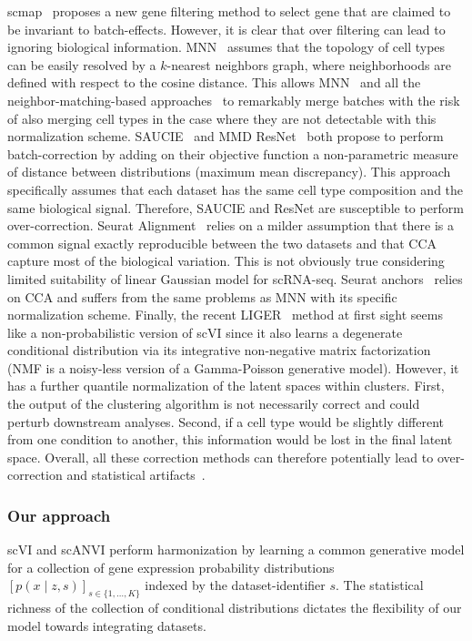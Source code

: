 scmap~\cite{scmap} proposes a new gene filtering method to select gene that are claimed to be invariant to batch-effects. However, it is clear that over filtering can lead to ignoring biological information.  
MNN~\cite{MNN} assumes that the topology of cell types can be easily resolved by a $k$-nearest neighbors graph, where neighborhoods are defined with respect to the cosine distance. This allows MNN~\cite{MNN} and all the neighbor-matching-based approaches~\cite{SEURAT3,scanorama} to remarkably merge batches with the risk of also merging cell types in the case where they are not detectable with this normalization scheme. 
SAUCIE~\cite{saucie} and MMD ResNet~\cite{resnetbatcheffect} both propose to perform batch-correction by adding on their objective function a non-parametric measure of distance between distributions (maximum mean discrepancy). This approach specifically assumes that each dataset has the same cell type composition and the same biological signal. Therefore, SAUCIE and ResNet are susceptible to perform over-correction. 
Seurat Alignment~\cite{seurat} relies on a milder assumption that there is a common signal exactly reproducible between the two datasets and that CCA capture most of the biological variation. This is not obviously true considering limited suitability of linear Gaussian model for scRNA-seq. 
Seurat anchors~\cite{SEURAT3} relies on CCA and suffers from the same problems as MNN with its specific normalization scheme. 
Finally, the recent LIGER~\cite{LIGER} method at first sight seems like a non-probabilistic version of scVI since it also learns a degenerate conditional distribution via its integrative non-negative matrix factorization~\cite{LIGER} (NMF is a noisy-less version of a Gamma-Poisson generative model). However, it has a further quantile normalization of the latent spaces within clusters. First, the output of the clustering algorithm is not necessarily correct and could perturb downstream analyses. Second, if a cell type would be slightly different from one condition to another, this information would be lost in the final latent space. Overall, all these correction methods can therefore potentially lead to over-correction and statistical artifacts~\cite{batchfalsede}.


\subsubsection{Our approach}
scVI and scANVI perform harmonization by learning a common generative model for a collection of gene expression probability distributions $\left[p(x \mid z, s)\right]_{s \in \{1, \ldots, K\}}$ indexed by the dataset-identifier $s$. The statistical richness of the collection of conditional distributions dictates the flexibility of our model towards integrating datasets. 


